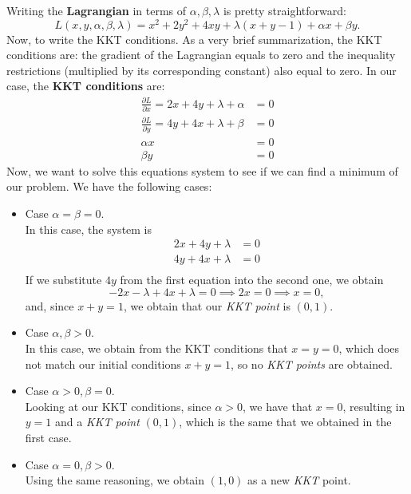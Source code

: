 \documentclass[11pt,table]{article}
\begin{document}
Writing the \textbf{Lagrangian} in terms of \(\alpha,\beta,\lambda\) is pretty straightforward:
\[
L(x,y,\alpha,\beta,\lambda) = x^{2} + 2y^{2} + 4xy + \lambda(x+y - 1) + \alpha x + \beta y .
\]
Now, to write the KKT conditions. As a very brief summarization, the KKT conditions are: the gradient of the Lagrangian equals to zero and the inequality restrictions (multiplied by its corresponding constant) also equal to zero. In our case, the \textbf{KKT conditions} are:
\begin{align*}
\frac{\partial L}{\partial x}  = 2x + 4y + \lambda + \alpha  & = 0\\ 
\frac{\partial L}{\partial y}  = 4y + 4x + \lambda + \beta & = 0\\ 
\alpha x & = 0\\
\beta y & = 0
\end{align*}
Now, we want to solve this equations system to see if we can find a minimum of our problem. We have the following cases:

\begin{itemize}
\item Case \(\alpha = \beta = 0\).\\
In this case, the system is
\begin{align*}
2x + 4y + \lambda  & = 0\\ 
4y + 4x + \lambda  & = 0\\ 
\end{align*}
If we substitute \(4y\) from the first equation into the second one, we obtain
\[
-2x - \lambda + 4x + \lambda = 0 \implies 2x = 0  \implies x = 0,
\]
and, since \(x+y = 1\), we obtain that our \emph{KKT point} is \((0,1)\).
\item Case \(\alpha, \beta > 0\).\\
In this case, we obtain from the KKT conditions that \(x=  y = 0\), which does not match our initial conditions \(x+y = 1\), so no \emph{KKT points} are obtained.
\item Case \(\alpha > 0, \beta = 0\).\\
Looking at our KKT conditions, since \(\alpha > 0\), we have that \(x = 0\), resulting in \(y=1\) and a \emph{KKT point} \((0,1)\), which is the same that we obtained in the first case.\\
\item Case \(\alpha = 0, \beta > 0\).\\
Using the same reasoning, we obtain \((1,0)\) as a new \emph{KKT} point.
\end{itemize}
\end{document}
